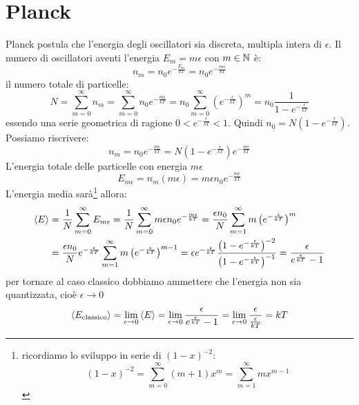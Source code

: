\section{Planck}
Planck postula che l'energia degli oscillatori sia discreta, multipla intera di $\epsilon$. Il numero di oscillatori aventi l'energia $E_m=m\epsilon$ con $m \in \mathbb{N}$ è:
\begin{equation}
	n_m=n_0 e^{-\frac{E_m}{kT}}=n_0 e^{-\frac{m\epsilon}{kT}}
\end{equation}
il numero totale di particelle:
\begin{equation}
	N=\sum_{m=0}^\infty n_m=\sum_{m=0}^\infty n_0e^{-\frac{m\epsilon}{kT}}=n_0\sum_{m=0}^\infty \left(e^{-\frac{\epsilon}{kT}}\right)^m=n_0\frac{1}{1-e^{-\frac{\epsilon}{kT}}}
\end{equation}
essendo una serie geometrica di ragione $0<e^{-\frac{\epsilon}{kT}}<1$. Quindi $n_0=N (1 - e^{-\frac{\epsilon}{kT}})$. Possiamo riscrivere:
\begin{equation}
	n_m=n_0 e^{-\frac{m\epsilon}{kT}} = N (1 - e^{-\frac{\epsilon}{kT}}) e^{-\frac{m\epsilon}{kT}}
\end{equation}
L'energia totale delle particelle con energia $m\epsilon$
\begin{equation}
	E_{m\epsilon}=n_m (m\epsilon)=m\epsilon n_0e^{-\frac{m\epsilon}{kT}}
\end{equation}
L'energia media sarà\footnote{ricordiamo lo sviluppo in serie di $(1-x)^{-2}$:
	\[
		\left(1-x\right)^{-2}=\sum_{m=0}^{\infty}(m+1)x^m=\sum_{m=1}^\infty m x^{m-1}
	\]
} allora:
\begin{equation}
	\begin{split}
		\left<E\right>&=\frac{1}{N}\sum_{m=0}^\infty E_{m\epsilon}=\frac{1}{N}\sum_{m=0}^\infty m\epsilon n_0e^{-\frac{m\epsilon}{kT}}=\frac{\epsilon n_0}{N} \sum_{m=1}^\infty m \left(e^{-\frac{\epsilon}{kT}}\right)^m\\
		&=\frac{\epsilon n_0}{N} e^{-\frac{\epsilon}{kT}}\sum_{m=1}^\infty m \left(e^{-\frac{\epsilon}{kT}}\right)^{m-1}
		=\epsilon e^{-\frac{\epsilon}{kT}}\dfrac{\left(1-e^{-\frac{\epsilon}{kT}}\right)^{-2}}{\left(1-e^{-\frac{\epsilon}{kT}}\right)^{-1}}=\frac{\epsilon}{e^{\frac{\epsilon}{kT}}-1}
	\end{split}
	\label{energia Planck modi01}
\end{equation}
per tornare al caso classico dobbiamo ammettere che l'energia non sia quantizzata, cioè $\epsilon\to 0$
\begin{equation}
	\left<E_\text{classico}\right>=\lim_{\epsilon\to 0} \left<E\right>=\lim_{\epsilon\to 0}\frac{\epsilon}{e^{\frac{\epsilon}{kT}}-1}=\lim_{\epsilon\to 0}\frac{\epsilon}{\frac{\epsilon}{kT}}=kT
\end{equation}

